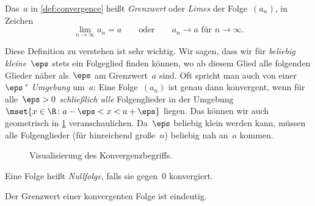 \documentclass[a4paper]{article}
\begin{document}
\begin{definition}
    Das~$a$ in \cref{def:convergence} heißt \emph{Grenzwert} oder \emph{Limes} der Folge~$(a_n)$, in Zeichen
    \begin{equation*}
        \lim_{n\to\infty} a_n = a \qquad\text{oder}\qquad a_n \to a \text{ für } n \to \infty.
    \end{equation*}
\end{definition}

Diese Definition zu verstehen ist sehr wichtig. Wir sagen, dass wir für \emph{beliebig kleine}~$\eps$ stets ein Folgeglied finden können, wo ab diesem Glied alle folgenden Glieder näher als~$\eps$ am Grenzwert~$a$ sind. Oft spricht man auch von einer \emph{$\eps$"~Umgebung} um~$a$: Eine Folge~$(a_n)$ ist genau dann konvergent, wenn für alle~$\eps > 0$ \emph{schließlich alle} Folgenglieder in der Umgebung $\mset{x \in \R\colon a-\eps < x < a+\eps}$ liegen. Das können wir auch geometrisch in \cref{fig:convergence} veranschaulichen. Da~$\eps$ beliebig klein werden kann, müssen alle Folgenglieder (für hinreichend große~$n$) beliebig nah an~$a$ kommen.

\begin{figure}
    \caption{Visualisierung des Konvergenzbegriffs.}\label{fig:convergence}
\end{figure}

\begin{definition}[Nullfolge]
    Eine Folge heißt \emph{Nullfolge}, falls sie gegen~$0$ konvergiert.
\end{definition}

\begin{theorem}
    Der Grenzwert einer konvergenten Folge ist eindeutig.
\end{theorem}
\end{document}
